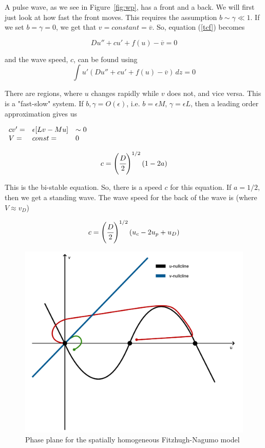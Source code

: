 \documentclass[]{article}
\numberwithin{equation}{section}		%
\begin{document}
A pulse wave, as we see in Figure~\ref{fig:wp}, has a front and a back. We will first just look at how fast the front moves. This requires the assumption $b\sim\gamma\ll1$. If we set $b=\gamma=0$, we get that $v=constant=\overline{v}$. So, equation (\ref{tcf}) becomes

$$Du''+cu' +f(u)-\overline{v}=0$$

and the wave speed, $c$, can be found using 
$$\int u'(Du''+cu'+f(u)-\overline{v})\,dz=0$$

There are regions, where $u$ changes rapidly while $v$ does not, and vice versa. This is a "fast-slow" system.
If $b, \gamma = O(\epsilon)$, i.e. $b = \epsilon M$, $\gamma = \epsilon L$, then a leading order approximation
gives us

\begin{center}
$\begin{array}{l l l}
c v' = & \epsilon [L v - Mu ] & \sim 0 \\
V = & const = & 0\\
\end{array} $
\end{center}

\begin{equation}
c = \left(\cfrac{D}{2} \right)^{1/2}(1 - 2 a)
\end{equation}


This is the bi-stable equation. So, there is a speed $c$ for this equation. If $a = 1/2,$ then we get a standing wave. The
wave speed for the back of the wave is (where $V\approx v_D$)

\begin{equation}
c = \left(\cfrac{D}{2} \right)^{1/2}(u_c - 2u_p + u_D)
\end{equation}

\begin{figure}
\caption{Phase plane for the spatially homogeneous Fitzhugh-Nagumo model}
\begin{center}
\includegraphics[scale=.20]{figures/FN_figure.jpg}
\end{center}
\label{fig:fn}
\end{figure}
\end{document}
